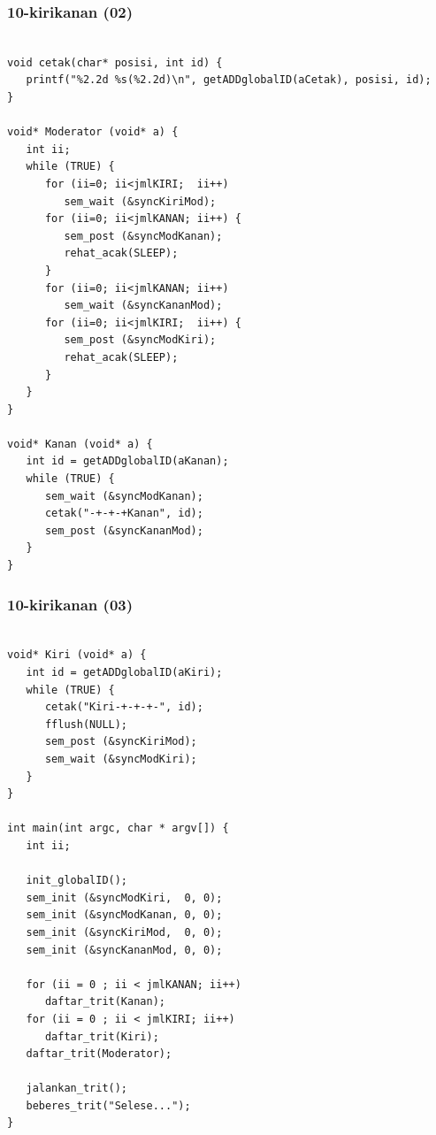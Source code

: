 \documentclass[aspectratio=169, xcolor=table, notheorems, hyperref={pdfpagelabels=false}]{beamer}
\begin{document}
\begin{frame}[fragile]
\frametitle{10-kirikanan (02)}
\begin{lstlisting}[basicstyle=\ttfamily\tiny]

void cetak(char* posisi, int id) {
   printf("%2.2d %s(%2.2d)\n", getADDglobalID(aCetak), posisi, id);
}

void* Moderator (void* a) {
   int ii;
   while (TRUE) {
      for (ii=0; ii<jmlKIRI;  ii++)
         sem_wait (&syncKiriMod);
      for (ii=0; ii<jmlKANAN; ii++) {
         sem_post (&syncModKanan);
         rehat_acak(SLEEP);
      }
      for (ii=0; ii<jmlKANAN; ii++)
         sem_wait (&syncKananMod);
      for (ii=0; ii<jmlKIRI;  ii++) {
         sem_post (&syncModKiri);
         rehat_acak(SLEEP);
      }
   }
}

void* Kanan (void* a) {
   int id = getADDglobalID(aKanan);
   while (TRUE) {
      sem_wait (&syncModKanan);
      cetak("-+-+-+Kanan", id);
      sem_post (&syncKananMod);
   }
}

\end{lstlisting}
\end{frame}

\begin{frame}[fragile]
\frametitle{10-kirikanan (03)}
\begin{lstlisting}[basicstyle=\ttfamily\tiny]

void* Kiri (void* a) {
   int id = getADDglobalID(aKiri);
   while (TRUE) {
      cetak("Kiri-+-+-+-", id);
      fflush(NULL);
      sem_post (&syncKiriMod);
      sem_wait (&syncModKiri);
   }
}

int main(int argc, char * argv[]) {
   int ii;

   init_globalID();
   sem_init (&syncModKiri,  0, 0);
   sem_init (&syncModKanan, 0, 0);
   sem_init (&syncKiriMod,  0, 0);
   sem_init (&syncKananMod, 0, 0);

   for (ii = 0 ; ii < jmlKANAN; ii++)
      daftar_trit(Kanan);
   for (ii = 0 ; ii < jmlKIRI; ii++)
      daftar_trit(Kiri);
   daftar_trit(Moderator);

   jalankan_trit();
   beberes_trit("Selese...");
}

\end{lstlisting}
\end{frame}
\end{document}
